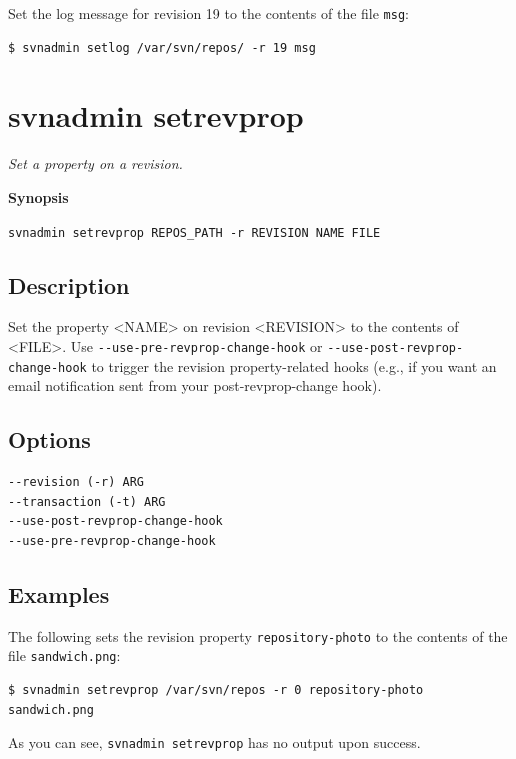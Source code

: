 Set the log message for revision 19 to the contents of the file
\texttt{msg}:

\begin{verbatim}
$ svnadmin setlog /var/svn/repos/ -r 19 msg
\end{verbatim}

\section{svnadmin setrevprop}\label{svn.ref.svnadmin.c.setrevprop}

\emph{Set a property on a revision.}

\textbf{Synopsis}

\texttt{svnadmin\ setrevprop\ REPOS\_PATH\ -r\ REVISION\ NAME\ FILE}

\subsection{Description}

Set the property \textless NAME\textgreater{} on revision
\textless REVISION\textgreater{} to the contents of
\textless FILE\textgreater. Use \texttt{-\/-use-pre-revprop-change-hook}
or \texttt{-\/-use-post-revprop-change-hook} to trigger the revision
property-related hooks (e.g., if you want an email notification sent
from your post-revprop-change hook).

\subsection{Options}

\begin{verbatim}
--revision (-r) ARG
--transaction (-t) ARG
--use-post-revprop-change-hook
--use-pre-revprop-change-hook
\end{verbatim}

\subsection{Examples}

The following sets the revision property \texttt{repository-photo} to
the contents of the file \texttt{sandwich.png}:

\begin{verbatim}
$ svnadmin setrevprop /var/svn/repos -r 0 repository-photo sandwich.png
\end{verbatim}

As you can see, \texttt{svnadmin\ setrevprop} has no output upon
success.

